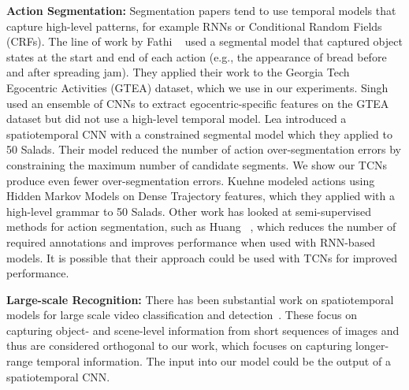 \documentclass[10pt,twocolumn,letterpaper]{article}
\newcommand{\fakesubsection}[1]{\smallskip\noindent\textbf{#1:}}
\begin{document}
\fakesubsection{Action Segmentation}
Segmentation papers tend to use temporal models that capture high-level patterns, for example RNNs or Conditional Random Fields (CRFs).
The line of work by Fathi \etal~\cite{fathi_cvpr_2011,fathi_cvpr_2013,fathi_iccv_2011} used a segmental model that captured object states at the start and end of each action (e.g., the appearance of bread before and after spreading jam). They applied their work to the Georgia Tech Egocentric Activities (GTEA) dataset, which we use in our experiments.
Singh \etal ~\cite{singh_cvpr_2016_ego} used an ensemble of CNNs to extract egocentric-specific features on the GTEA dataset but did not use a high-level temporal model.
Lea \etal \cite{lea_eccv_2016} introduced a spatiotemporal CNN with a constrained segmental model which they applied to 50 Salads. Their model reduced the number of action over-segmentation errors by constraining the maximum number of candidate segments. We show our TCNs produce even fewer over-segmentation errors.
Kuehne \etal \cite{kuehne_cvpr_2014,kuehne_wacv_2016} modeled actions using Hidden Markov Models on Dense Trajectory features, which they applied with a high-level grammar to 50 Salads. 
Other work has looked at semi-supervised methods for action segmentation, such as Huang \etal~\cite{huang_eccv_2016}, which reduces the number of required annotations and improves performance when used with RNN-based models. 
It is possible that their approach could be used with TCNs for improved performance. 














\fakesubsection{Large-scale Recognition}
There has been substantial work on spatiotemporal models for large scale video classification and detection~\cite{sun_iccv_2015,jain_cvpr_2015,karpathy_cvpr_2014,simonyan_nips_2014,tran_iccv_2015,peng_thumos_2015,ng_cvpr_2015}. 
These focus on capturing object- and scene-level information from short sequences of images and thus are considered orthogonal to our work, which focuses on capturing longer-range temporal information. The input into our model could be the output of a spatiotemporal CNN. 
\end{document}
